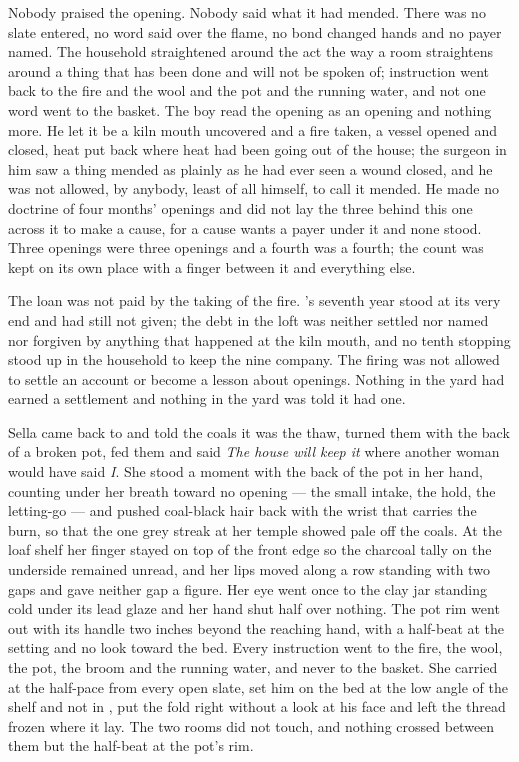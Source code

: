 Nobody praised the opening. Nobody said what it had mended. There was no slate entered, no word said over the flame, no bond changed hands and no payer named. The household straightened around the act the way a room straightens around a thing that has been done and will not be spoken of; instruction went back to the fire and the wool and the pot and the running water, and not one word went to the basket. The boy read the opening as an opening and nothing more. He let it be a kiln mouth uncovered and a fire taken, a vessel opened and closed, heat put back where heat had been going out of the house; the surgeon in him saw a thing mended as plainly as he had ever seen a wound closed, and he was not allowed, by anybody, least of all himself, to call it mended. He made no doctrine of four months' openings and did not lay the three behind this one across it to make a cause, for a cause wants a payer under it and none stood. Three openings were three openings and a fourth was a fourth; the count was kept on its own place with a finger between it and everything else.

The loan was not paid by the taking of the fire. 's seventh year stood at its very end and had still not given; the debt in the loft was neither settled nor named nor forgiven by anything that happened at the kiln mouth, and no tenth stopping stood up in the household to keep the nine company. The firing was not allowed to settle an account or become a lesson about openings. Nothing in the yard had earned a settlement and nothing in the yard was told it had one.

\scenebreak

Sella came back to  and told the coals it was the thaw, turned them with the back of a broken pot, fed them and said \emph{The house will keep it} where another woman would have said \emph{I}. She stood a moment with the back of the pot in her hand, counting under her breath toward no opening --- the small intake, the hold, the letting-go --- and pushed coal-black hair back with the wrist that carries the burn, so that the one grey streak at her temple showed pale off the coals. At the loaf shelf her finger stayed on top of the front edge so the charcoal tally on the underside remained unread, and her lips moved along a row standing with two gaps and gave neither gap a figure. Her eye went once to the clay jar standing cold under its lead glaze and her hand shut half over nothing. The pot rim went out with its handle two inches beyond the reaching hand, with a half-beat at the setting and no look toward the bed. Every instruction went to the fire, the wool, the pot, the broom and the running water, and never to the basket. She carried at the half-pace from every open slate, set him on the bed at the low angle of the shelf and not in , put the fold right without a look at his face and left the thread frozen where it lay. The two rooms did not touch, and nothing crossed between them but the half-beat at the pot's rim.

